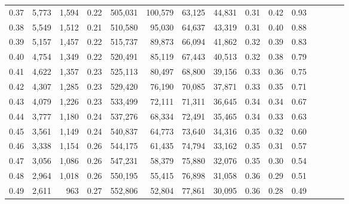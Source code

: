 \begin{tabular}{rrrcrrrrrrrrrrr}
0.37 &   5,773 &  1,594 &                                       0.22 &  505,031 &  100,579 &   63,125 &   44,831 &  0.31 &  0.42 &                         0.93 \\
0.38 &   5,549 &  1,512 &                                       0.21 &  510,580 &   95,030 &   64,637 &   43,319 &  0.31 &  0.40 &                         0.88 \\
0.39 &   5,157 &  1,457 &                                       0.22 &  515,737 &   89,873 &   66,094 &   41,862 &  0.32 &  0.39 &                         0.83 \\
0.40 &   4,754 &  1,349 &                                       0.22 &  520,491 &   85,119 &   67,443 &   40,513 &  0.32 &  0.38 &                         0.79 \\
0.41 &   4,622 &  1,357 &                                       0.23 &  525,113 &   80,497 &   68,800 &   39,156 &  0.33 &  0.36 &                         0.75 \\
0.42 &   4,307 &  1,285 &                                       0.23 &  529,420 &   76,190 &   70,085 &   37,871 &  0.33 &  0.35 &                         0.71 \\
0.43 &   4,079 &  1,226 &                                       0.23 &  533,499 &   72,111 &   71,311 &   36,645 &  0.34 &  0.34 &                         0.67 \\
0.44 &   3,777 &  1,180 &                                       0.24 &  537,276 &   68,334 &   72,491 &   35,465 &  0.34 &  0.33 &                         0.63 \\
0.45 &   3,561 &  1,149 &                                       0.24 &  540,837 &   64,773 &   73,640 &   34,316 &  0.35 &  0.32 &                         0.60 \\
0.46 &   3,338 &  1,154 &                                       0.26 &  544,175 &   61,435 &   74,794 &   33,162 &  0.35 &  0.31 &                         0.57 \\
0.47 &   3,056 &  1,086 &                                       0.26 &  547,231 &   58,379 &   75,880 &   32,076 &  0.35 &  0.30 &                         0.54 \\
0.48 &   2,964 &  1,018 &                                       0.26 &  550,195 &   55,415 &   76,898 &   31,058 &  0.36 &  0.29 &                         0.51 \\
0.49 &   2,611 &    963 &                                       0.27 &  552,806 &   52,804 &   77,861 &   30,095 &  0.36 &  0.28 &                         0.49 \\

\end{tabular}
